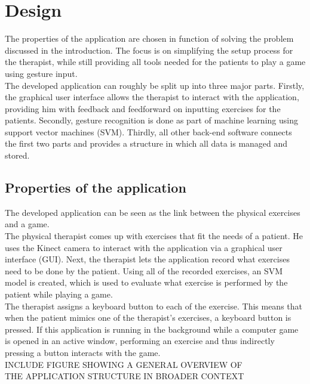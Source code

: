\chapter{Design}

The properties of the application are chosen in function of solving the problem discussed in the introduction. The focus is on simplifying the setup process for the therapist, while still providing all tools needed for the patients to play a game using gesture input.\\

The developed application can roughly be split up into three major parts. Firstly, the graphical user interface allows the therapist to interact with the application, providing him with feedback and feedforward on inputting exercises for the patients. Secondly, gesture recognition is done as part of machine learning using support vector machines (SVM). Thirdly, all other back-end software connects the first two parts and provides a structure in which all data is managed and stored.


\section{Properties of the application}

The developed application can be seen as the link between the physical exercises and a game.\\

The physical therapist comes up with exercises that fit the needs of a patient. He uses the Kinect camera to interact with the application via a graphical user interface (GUI). Next, the therapist lets the application record what exercises need to be done by the patient. Using all of the recorded exercises, an SVM model is created, which is used to evaluate what exercise is performed by the patient while playing a game.\\

The therapist assigns a keyboard button to each of the exercise. This means that when the patient mimics one of the therapist's exercises, a keyboard button is pressed. If this application is running in the background while a computer game is opened in an active window, performing an exercise and thus indirectly pressing a button interacts with the game.\\

INCLUDE FIGURE SHOWING A GENERAL OVERVIEW OF\\
THE APPLICATION STRUCTURE IN BROADER CONTEXT\\

